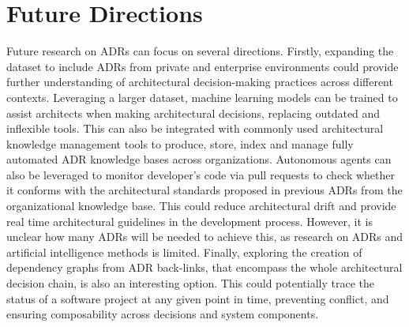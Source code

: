     \section{Future Directions}
        Future research on ADRs can focus on several directions. Firstly, expanding the dataset to include ADRs from private and enterprise environments could provide further understanding of architectural decision-making practices across different contexts. Leveraging a larger dataset, machine learning models can be trained to assist architects when making architectural decisions, replacing outdated and inflexible tools. This can also be integrated with commonly used architectural knowledge management tools to produce, store, index and manage fully automated ADR knowledge bases across organizations. Autonomous agents can also be leveraged to monitor developer's code via pull requests to check whether it conforms with the architectural standards proposed in previous ADRs from the organizational knowledge base. This could reduce architectural drift and provide real time architectural guidelines in the development process. However, it is unclear how many ADRs will be needed to achieve this, as research on ADRs and artificial intelligence methods is limited. Finally, exploring the creation of dependency graphs from ADR back-links, that encompass the whole architectural decision chain, is also an interesting option. This could potentially trace the status of a software project at any given point in time, preventing conflict, and ensuring composability across decisions and system components.   